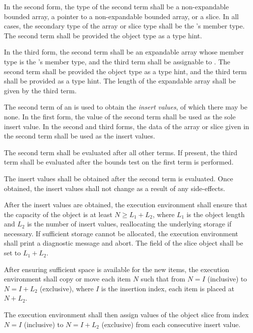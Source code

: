 \specsubsubitem
In the second form, the type of the second term shall be a non-expandable
bounded array, a pointer to a non-expandable bounded array, or a slice. In all
cases, the secondary type of the array or slice type shall be the
's member type. The second term shall be provided
the object type as a type hint.

\specsubsubitem
In the third form, the second term shall be an expandable array whose member
type is the 's member type, and the third term
shall be assignable to . The second term shall be provided the
object type as a type hint, and the third term shall be provided 
as a type hint. The length of the expandable array shall be given by the third
term.

\specsubsubitem
The second term of an  is used to obtain the
\textit{insert values}, of which there may be none. In the first form, the
value of the second term shall be used as the sole insert value. In the second
and third forms, the data of the array or slice given in the second term shall
be used as the insert values.

\specsubsubitem
The second term shall be evaluated after all other terms. If present, the third
term shall be evaluated after the bounds test on the first term is performed.

\specsubsubitem
The insert values shall be obtained after the second term is evaluated. Once
obtained, the insert values shall not change as a result of any side-effects.

\specsubsubitem
After the insert values are obtained, the execution environment shall ensure
that the capacity of the object is at least $N \geq L_1 + L_2$, where $L_1$ is
the object length and $L_2$ is the number of insert values, reallocating the
underlying storage if necessary. If sufficient storage cannot be allocated, the
execution environment shall print a diagnostic message and abort. The
 field of the slice object shall be set to $L_1 + L_2$.

\specsubsubitem
After ensuring sufficient space is available for the new items, the execution
environment shall copy or move each item $N$ such that from $N=I$ (inclusive)
to $N=I+L_2$ (exclusive), where $I$ is the insertion index, each item is placed
at $N+L_2$.

\specsubsubitem
The execution environment shall then assign values of the object slice from
index $N = I$ (inclusive) to $N = I+L_2$ (exclusive) from each consecutive
insert value.

